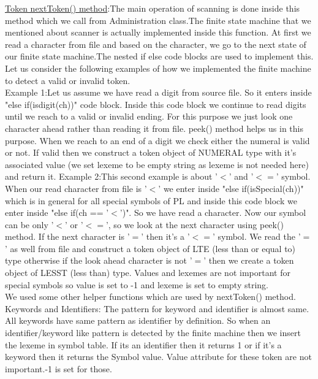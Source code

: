 \documentclass[paper=letter, fontsize=12pt]{scrartcl} %
\begin{document}
\underline {Token nextToken() method}:The main operation of scanning is done inside this method which we call from Administration class.The finite state machine that we mentioned about scanner is actually implemented inside this function.
At first we read a character from file and based on the character, we go to the next state of our finite state machine.The nested if else code blocks are used to implement this. Let us consider the following examples of how we implemented the finite machine to detect a valid or invalid token.\\

Example 1:Let us assume we have read a digit from source file. So it enters inside "else if(isdigit(ch))" code block. Inside this code block we continue to read digits until we reach to a valid or invalid ending. For this purpose we just look one character ahead rather than reading it from file. peek() method helps us in this purpose. When we reach to an end of a digit we check either the numeral is valid or not. If valid then we construct a token object of NUMERAL type with it's associated value (we set lexeme to be empty string as lexeme is not needed here) and return it. 
Example 2:This second example is about '$<$' and '$<=$' symbol. When our read character from file is '$<$' we enter inside "else if(isSpecial(ch))" which is in general for all special symbols of PL and inside this code block we enter inside "else if(ch == '$<$')". So we have read a character. Now our symbol can be only '$<$' or '$<=$', so we look at the next character using peek() method. If the next character is '$=$' then it's a '$<=$' symbol. We read the '$=$' as well from file and construct a token object of LTE (less than or equal to) type otherwise if the look ahead character is not '$=$' then we create a token object of LESST (less than) type. Values and lexemes are not important for special symbols so value is set to -1 and lexeme is set to empty string.\\

We used some other helper functions which are used by nextToken() method.\\

Keywords and Identifiers: The pattern for keyword and identifier is almost same. All keywords have same pattern as identifier by definition. So when an identifier/keyword like pattern is detected by the finite machine then we insert the lexeme in symbol table. If its an identifier then it returns 1 or if it's a keyword then it returns the Symbol value. Value attribute for these token are not important.-1 is set for those.\\
\end{document}
